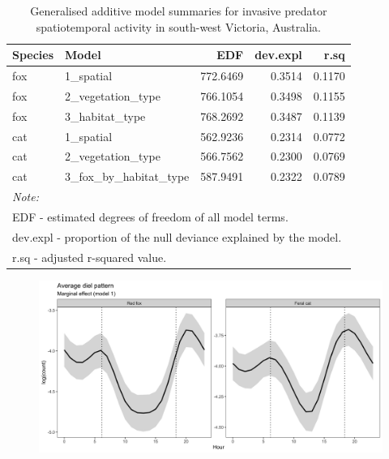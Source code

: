 \documentclass[11pt,a4paper,titlepage,twoside,openright]{style/unimelbthesis}
\begin{document}
\begin{mainmatter}
\begingroup\fontsize{10}{12}\selectfont
\begin{longtable}[t]{llrrr}
\caption{\label{tab:diel-tab-fits}Generalised additive model summaries for invasive predator spatiotemporal activity in south-west Victoria, Australia.}\\
\toprule
Species & Model & EDF & dev.expl & r.sq\\
\midrule
fox & 1\_spatial & 772.6469 & 0.3514 & 0.1170\\
fox & 2\_vegetation\_type & 766.1054 & 0.3498 & 0.1155\\
fox & 3\_habitat\_type & 768.2692 & 0.3487 & 0.1139\\
cat & 1\_spatial & 562.9236 & 0.2314 & 0.0772\\
cat & 2\_vegetation\_type & 566.7562 & 0.2300 & 0.0769\\
\addlinespace
cat & 3\_fox\_by\_habitat\_type & 587.9491 & 0.2322 & 0.0789\\
\bottomrule
\multicolumn{5}{l}{\rule{0pt}{1em}\textit{Note: }}\\
\multicolumn{5}{l}{\rule{0pt}{1em}EDF - estimated degrees of freedom of all model terms.}\\
\multicolumn{5}{l}{\rule{0pt}{1em}dev.expl - proportion of the null deviance explained by the model. }\\
\multicolumn{5}{l}{\rule{0pt}{1em}r.sq -  adjusted r-squared value.}\\
\end{longtable}
\endgroup{}

\newpage
\begin{figure}

{\centering \includegraphics[width=1\linewidth]{figure/avg_diel_predator} 

}


\end{figure}
\end{mainmatter}
\end{document}
